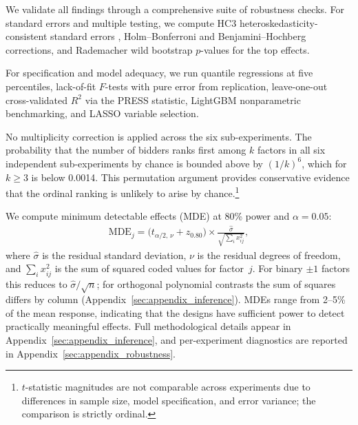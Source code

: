 We validate all findings through a comprehensive suite of robustness checks. For standard errors and multiple testing, we compute HC3 heteroskedasticity-consistent standard errors \citep{MacKinnonWhite1985}, Holm--Bonferroni and Benjamini--Hochberg corrections, and Rademacher wild bootstrap $p$-values for the top effects.

For specification and model adequacy, we run quantile regressions at five percentiles, lack-of-fit $F$-tests with pure error from replication, leave-one-out cross-validated $R^2$ via the PRESS statistic, LightGBM nonparametric benchmarking, and LASSO variable selection.

No multiplicity correction is applied across the six sub-experiments. The probability that the number of bidders ranks first among $k$ factors in all six independent sub-experiments by chance is bounded above by $(1/k)^6$, which for $k \geq 3$ is below 0.0014. This permutation argument provides conservative evidence that the ordinal ranking is unlikely to arise by chance.\footnote{$t$-statistic magnitudes are not comparable across experiments due to differences in sample size, model specification, and error variance; the comparison is strictly ordinal.}

We compute minimum detectable effects (MDE) at 80\% power and $\alpha = 0.05$:
\begin{align}
  \text{MDE}_{j} = \bigl(t_{\alpha/2,\,\nu} + z_{0.80}\bigr) \times \frac{\hat{\sigma}}{\sqrt{\sum_{i} x_{ij}^{2}}},
  \label{eq:mde}
\end{align}
where $\hat{\sigma}$ is the residual standard deviation, $\nu$ is the residual degrees of freedom, and $\sum_{i} x_{ij}^{2}$ is the sum of squared coded values for factor~$j$. For binary $\pm 1$ factors this reduces to $\hat{\sigma}/\sqrt{n}$; for orthogonal polynomial contrasts the sum of squares differs by column (Appendix~\ref{sec:appendix_inference}). MDEs range from 2--5\% of the mean response, indicating that the designs have sufficient power to detect practically meaningful effects. Full methodological details appear in Appendix~\ref{sec:appendix_inference}, and per-experiment diagnostics are reported in Appendix~\ref{sec:appendix_robustness}.
